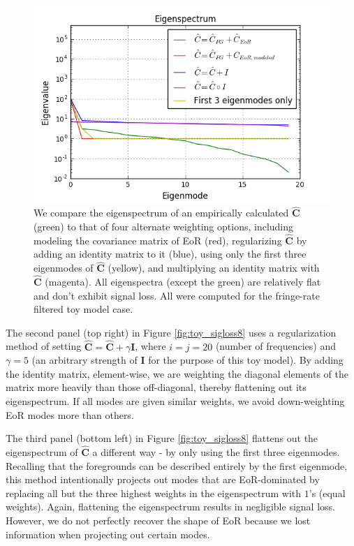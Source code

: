 \documentclass[preprint2,numberedappendix,tighten]{aastex6}  %
\begin{document}
\begin{figure}
	\centering
	\includegraphics[trim={0.3cm 0.3cm 0.3cm 0.3cm},clip,width=\columnwidth]{plots/toy_sigloss14.png}
	\caption{We compare the eigenspectrum of an empirically calculated $\hat{\textbf{C}}$ (green) to that of four alternate 
weighting options, including modeling the covariance matrix of EoR (red), regularizing $\hat{\textbf{C}}$ by adding an identity 
matrix to it (blue), using only the first three eigenmodes of $\hat{\textbf{C}}$ (yellow), and multiplying an identity matrix with $
\hat{\textbf{C}}$ (magenta). All eigenspectra (except the green) are relatively flat and don't exhibit signal loss. All were 
computed for the fringe-rate filtered toy model case.}
	\label{fig:toy_sigloss14}
\end{figure}

The second panel (top right) in Figure \ref{fig:toy_sigloss8} uses a regularization method of setting $\hat{\textbf{C}} = 
\hat{\textbf{C}} + \gamma\textbf{I}$, where $i$$=$$j$$=$$20$ (number of frequencies) and $\gamma = 5$ (an arbitrary strength 
of $\textbf{I}$ for the purpose of this toy model). By adding the identity matrix, element-wise, we are weighting the diagonal 
elements of the matrix more heavily than those off-diagonal, thereby flattening out its eigenspectrum. If all modes are given 
similar weights, we avoid down-weighting EoR modes more than others.  

The third panel (bottom left) in Figure \ref{fig:toy_sigloss8} flattens out the eigenspectrum of $\hat{\textbf{C}}$ a different way - 
by only using the first three eigenmodes. Recalling that the foregrounds can be described entirely by the first eigenmode, this 
method intentionally projects out modes that are EoR-dominated by replacing all but the three highest weights in the 
eigenspectrum with $1$'s (equal weights). Again, flattening the eigenspectrum results in negligible signal loss. However, we do 
not perfectly recover the shape of EoR because we lost information when projecting out certain modes. 
\end{document}
